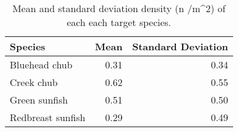 \begin{table}[ht]
\centering
\caption{Mean and standard deviation density (n /m^2) of each each target species.} 
\label{tab:density}
\begin{tabular}{lrr}
  \hline
Species & Mean & Standard Deviation \\ 
  \hline
Bluehead chub & 0.31 & 0.34 \\ 
  Creek chub & 0.62 & 0.55 \\ 
  Green sunfish & 0.51 & 0.50 \\ 
  Redbreast sunfish & 0.29 & 0.49 \\ 
   \hline
\end{tabular}
\end{table}
